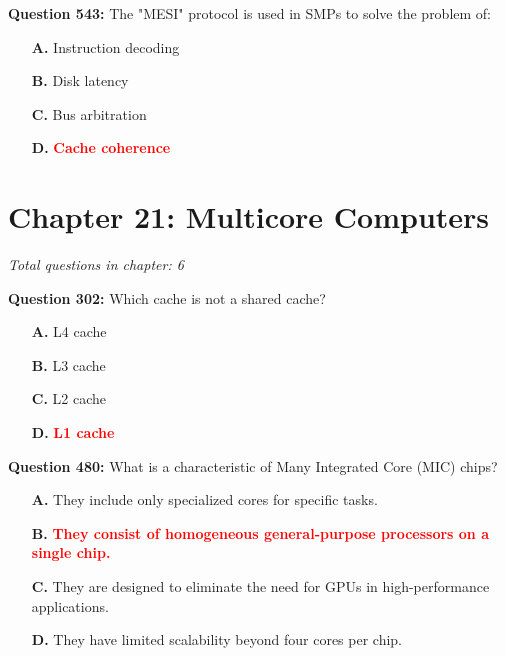 \documentclass[12pt,a4paper]{article}
\begin{document}
\vspace{0.5cm}

\vspace{0.5cm}



\textbf{Question 543:} The "MESI" protocol is used in SMPs to solve the problem of:

\begin{itemize}
    \item[\textbf{A.}] Instruction decoding
    \item[\textbf{B.}] Disk latency
    \item[\textbf{C.}] Bus arbitration
    \item[\textbf{D.}] \textcolor{red}{\textbf{Cache coherence}}
\end{itemize}

\section{Chapter 21: Multicore Computers}
\textit{Total questions in chapter: 6}

\textbf{Question 302:} Which cache is not a shared cache?

\begin{itemize}
    \item[\textbf{A.}] L4 cache
    \item[\textbf{B.}] L3 cache
    \item[\textbf{C.}] L2 cache
    \item[\textbf{D.}] \textcolor{red}{\textbf{L1 cache}}
\end{itemize}

\vspace{0.5cm}

\vspace{0.5cm}

\textbf{Question 480:} What is a characteristic of Many Integrated Core (MIC) chips?

\begin{itemize}
    \item[\textbf{A.}] They include only specialized cores for specific tasks.
    \item[\textbf{B.}] \textcolor{red}{\textbf{They consist of homogeneous general-purpose processors on a single chip.}}
    \item[\textbf{C.}] They are designed to eliminate the need for GPUs in high-performance applications.
    \item[\textbf{D.}] They have limited scalability beyond four cores per chip.
\end{itemize}

\vspace{0.5cm}
\end{document}
